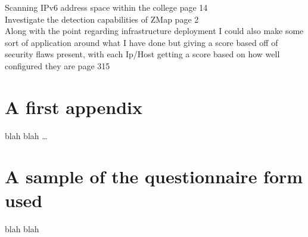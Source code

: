 \documentclass[a4wide,leqno,12pt]{report}
\begin{document}
Scanning IPv6 address space within the college \cite{durumeric2013zmap} page 14\\

Investigate the detection capabilities of ZMap \cite{lee2003detection} page 2\\


Along with the point regarding infrastructure deployment I could also make some sort of application around what I have done but giving a score based off of security flaws present, with each Ip/Host getting a score based on how well configured they are \cite{mendes2008assessing} page 315





\appendix
\chapter{A first appendix}

blah blah \ldots


\chapter{A sample of the questionnaire form used}

blah blah
\end{document}
